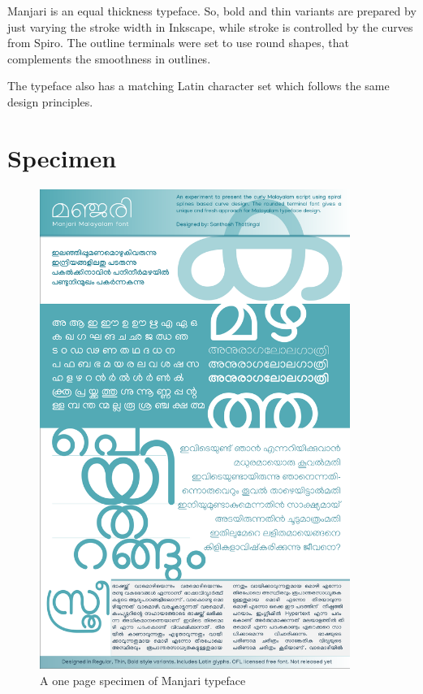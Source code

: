 \documentclass[11pt,twoside,a4paper,parskip=half]{scrartcl}
\begin{document}
Manjari is an equal thickness typeface. So, bold and thin variants are prepared by just varying the stroke width in Inkscape, while stroke is controlled by the curves from Spiro. The outline terminals were set to use round shapes, that complements the smoothness in outlines.

The typeface also has a matching Latin character set which follows the same design principles.
\clearpage
\section{Specimen}


\begin{figure}[h!]
\includegraphics[width=0.9\textwidth]{images/Manjari-Specimen.pdf}
	\caption{A one page specimen of Manjari typeface}
\label{specimen}
\end{figure}

\clearpage
\end{document}
